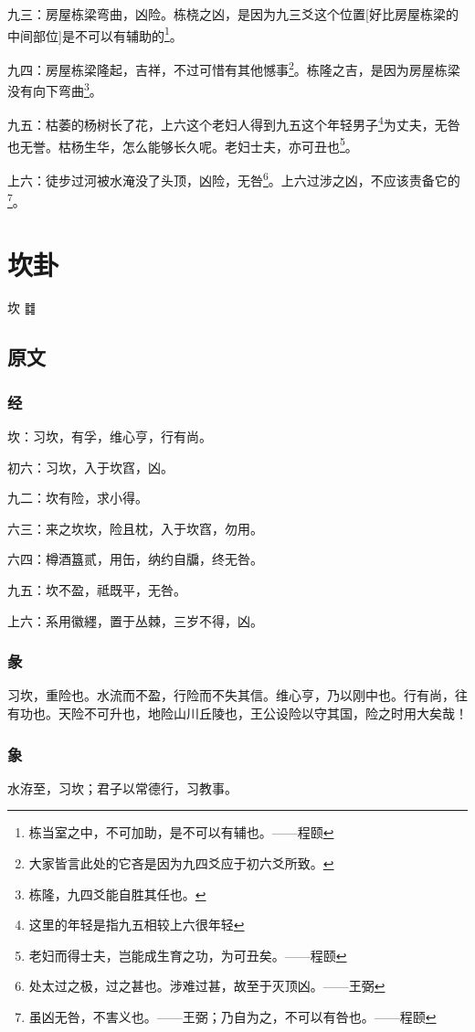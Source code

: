 \documentclass[12pt,oneside]{book}
\begin{document}
九三：房屋栋梁弯曲，凶险。栋桡之凶，是因为九三爻这个位置[好比房屋栋梁的中间部位]是不可以有辅助的\footnote{栋当室之中，不可加助，是不可以有辅也。——程颐}。

九四：房屋栋梁隆起，吉祥，不过可惜有其他憾事\footnote{大家皆言此处的它吝是因为九四爻应于初六爻所致。}。栋隆之吉，是因为房屋栋梁没有向下弯曲\footnote{栋隆，九四爻能自胜其任也。}。

九五：枯萎的杨树长了花，上六这个老妇人得到九五这个年轻男子\footnote{这里的年轻是指九五相较上六很年轻}为丈夫，无咎也无誉。枯杨生华，怎么能够长久呢。老妇士夫，亦可丑也\footnote{老妇而得士夫，岂能成生育之功，为可丑矣。——程颐}。

上六：徒步过河被水淹没了头顶，凶险，无咎\footnote{处太过之极，过之甚也。涉难过甚，故至于灭顶凶。——王弼}。上六过涉之凶，不应该责备它的\footnote{虽凶无咎，不害义也。——王弼；乃自为之，不可以有咎也。——程颐}。


\chapter{坎卦}
坎 {\Large ䷜}

\section{原文}

\subsection{经}
坎：习坎，有孚，维心亨，行有尚。

初六：习坎，入于坎窞，凶。

九二：坎有险，求小得。

六三：来之坎坎，险且枕，入于坎窞，勿用。

六四：樽酒簋贰，用缶，纳约自牖，终无咎。

九五：坎不盈，祗既平，无咎。

上六：系用徽纆，置于丛棘，三岁不得，凶。

\subsection{彖}
习坎，重险也。水流而不盈，行险而不失其信。维心亨，乃以刚中也。行有尚，往有功也。天险不可升也，地险山川丘陵也，王公设险以守其国，险之时用大矣哉！

\subsection{象}
水洊至，习坎；君子以常德行，习教事。
\end{document}

